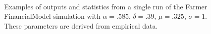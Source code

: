 \documentclass[runningheads]{llncs}
\begin{document}
\begin{figure}[htbp]
\begin{center}
{      }
\mbox{
     }
    \caption{Examples of outputs and statistics from a single run of the Farmer FinancialModel simulation with $\alpha=.585$, $\delta=.39$, $\mu=.325$, $\sigma=1$. These parameters are derived from empirical data.}
    \label{fig:sampleDynamicsFarmer}
  \end{center}
\end{figure}
\end{document}
